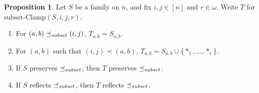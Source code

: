 \documentclass[12pt]{article}
\theoremstyle{definition}
\newtheorem{proposition}{Proposition}
\newcommand{\set}[1]{\{ #1 \}}
\newcommand{\rem}[1]{\relax}
\newcommand{\Pairs}{\mbox{Pairs}}
\newcommand{\sClamp}{\mbox{subset-Clamp}}
\newcommand{\precsubseteq}{\preceq_{\scriptsize subset}}
\begin{document}
\begin{proposition}
Let $S$ be a family on $n$, and fix $i,j\in[n]$
and $r\in\omega$.
Write $T$ for $\sClamp(S,i,j,r)$.
\begin{enumerate}
    \item For $(a,b)\precsubseteq (i,j)$, $T_{a,b} = S_{a,b}$.
    \label{part-easy}
\item For $(a,b)$ such that $(i,j) \prec (a,b)$, $T_{a,b} =  S_{a,b}\cup\set{*_1,\ldots, *_r}$.
\label{part-bigger}
\rem{    \item For all $(a,b), (c,d)$
    in \[\Pairs(n)\setminus
    \set{(i,j),(i,i),(j,j)} \]
we have 
\[ s_{a,b} - s_{c,d} = t_{a,b} - t_{c,d}.\]
}
\item If $S$ preserves $\precsubseteq$,
then $T$  preserves $\precsubseteq$.
\label{part-preserve}
\item If $S$  reflects $\precsubseteq$,
then $T$  reflects $\precsubseteq$.
\label{part-reflect}
\end{enumerate}
\label{proposition-sClamp}
\end{proposition}
\end{document}
